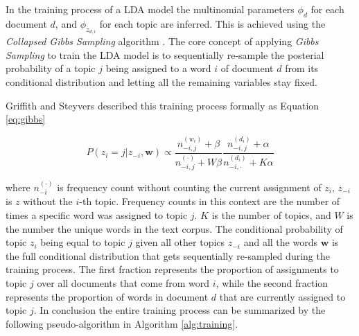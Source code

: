             In the training process of a LDA model the multinomial parameters $\phi_d$ for each document $d$, and $\phi_{z_{d,i}}$ for each topic are inferred. This is achieved using the \emph{Collapsed Gibbs Sampling} algorithm \cite{griffiths2004finding}. The core concept of applying \emph{Gibbs Sampling} to train the LDA model is to sequentially re-sample the posterial probability of a topic $j$ being assigned to a word $i$ of document $d$ from its conditional distribution and letting all the remaining variables stay fixed.
            
            Griffith and Steyvers \cite{griffiths2004finding} described this training process formally as Equation \ref{eq:gibbs}
            
            \begin{equation} \label{eq:gibbs}
                P(z_i = j| \textbf{$z_{-i}$}, \textbf{w}) \propto \frac{n_{-i,j}^{(w_i)} + \beta}{n_{-i,j}^{(\cdot)} + W \beta} \frac{n_{-i,j}^{(d_i)} + \alpha}{n_{-i,\cdot}^{(d_i)} + K \alpha}
            \end{equation}
            
            where $n_{-i}^{(\cdot)}$ is frequency count without counting the current assignment of $z_i$, $z_{-i}$ is $z$ without the $i$-th topic. Frequency counts in this context are the number of times a specific word was assigned to topic $j$. $K$ is the number of topics, and $W$ is the number the unique words in the text corpus. The conditional probability of topic $z_i$ being equal to topic $j$ given all other topics $z_{-i}$ and all the words $\textbf{w}$ is the full conditional distribution that gets sequentially re-sampled during the training process. The first fraction represents the proportion of assignments to topic $j$ over all documents that come from word $i$, while the second fraction represents the proportion of words in document $d$ that are currently assigned to topic $j$. In conclusion the entire training process can be summarized by the following pseudo-algorithm in Algorithm \ref{alg:training}.
            
            
            
                    
